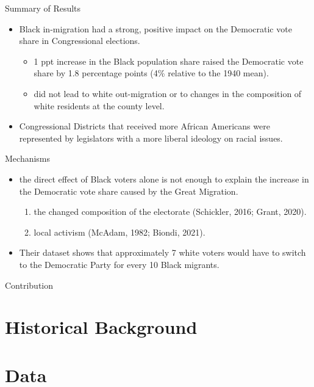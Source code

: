 \documentclass[dvipdfmx,11pt]{beamer}
\begin{document}
\begin{frame}{Summary of Results}
  \begin{itemize}
    \item Black in-migration had a strong, positive impact on the Democratic vote share in Congressional elections.
    \begin{itemize}
      \item 1 ppt increase in the Black population share raised the Democratic vote share by 1.8 percentage points (4\% relative to the 1940 mean).
      \item did not lead to white out-migration or to changes in the composition of white residents at the county level.
    \end{itemize}
    \item Congressional Districts that received more African Americans were represented by legislators with a more
    liberal ideology on racial issues.
  \end{itemize}
\end{frame}

\begin{frame}{Mechanisms}
  \begin{itemize}
    \item the direct effect of Black voters alone is not enough to explain the increase in the Democratic vote share caused by the Great Migration.
    \begin{enumerate}
      \item the changed composition of the electorate (Schickler, 2016; Grant, 2020).
      \item local activism (McAdam, 1982; Biondi, 2021).
    \end{enumerate}
    \item Their dataset shows that approximately 7 white voters would have to switch to the Democratic Party for every 10 Black migrants.
  \end{itemize}
\end{frame}

\begin{frame}{Contribution}
  
\end{frame}

\section{Historical Background}
\frame{\sectionpage}

\section{Data}
\frame{\sectionpage}
\end{document}
